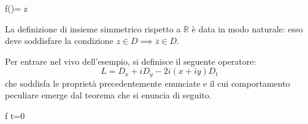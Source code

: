 \begin{example}
\begin{namedtheorem}
{f()= \quad \forall z \in {}}
\end{namedtheorem}

\begin{remark}
La definizione di insieme simmetrico rispetto a $\mathbb{R}$ è data in modo naturale: esso deve soddisfare la condizione $z \in D \implies \overline{z} \in D$.
\end{remark}

Per entrare nel vivo dell'esempio, si definisce il seguente operatore:
$$L=D_x+iD_y-2i(x+iy)D_t$$
che soddisfa le proprietà precedentemente enunciate e il cui comportamento peculiare emerge dal teorema che si enuncia di seguito.

\begin{theorem}\label{Lewy}
{f  t=0}
\end{theorem}


\end{example}
